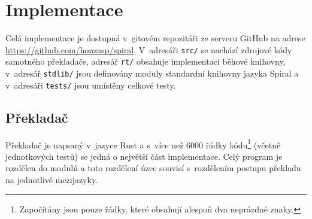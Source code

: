 \chapter{Implementace}

Celá implementace je dostupná v~gitovém repozitáři ze serveru GitHub na adrese
\url{https://github.com/honzasp/spiral}. V~adresáři \texttt{src/} se nachází
zdrojové kódy samotného překladače, adresář \texttt{rt/} obsahuje implementaci
běhové knihovny, v~adresář \texttt{stdlib/} jsou definovány moduly standardní
knihovny jazyka Spiral a v~adresáři \texttt{tests/} jsou umístěny celkové testy.

\section{Překladač}

Překladač je napsaný v~jazyce Rust \cite{rust} a s~více než 6000 řádky
kódu\footnote{Započítány jsou pouze řádky, které obsahují alespoň dva neprázdné
znaky.} (včetně jednotkových testů) se jedná o největší část implementace. Celý
program je rozdělen do modulů a toto rozdělení úzce souvisí s~rozdělením postupu
překladu na jednotlivé mezijazyky.

